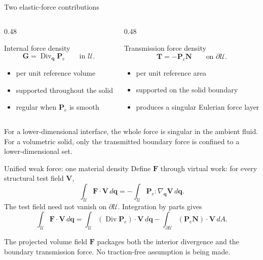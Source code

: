 \documentclass[aspectratio=169,11pt]{beamer}
\newcommand{\Xvec}{\bm{q}}
\newcommand{\Fvec}{\bm{F}}
\newcommand{\Pten}{\bm{P}_{e}}
\newcommand{\Nvec}{\bm{N}}
\begin{document}
\begin{frame}{Two elastic-force contributions}
\begin{columns}[T,onlytextwidth]
  \begin{column}{0.48\textwidth}
  \begin{block}{Internal force density}
    \[
      \bm{G}=\operatorname{Div}_{\!\Xvec}\Pten
      \qquad\text{in }\mathcal U.
    \]
    \begin{itemize}
      \item per unit reference volume
      \item supported throughout the solid
      \item regular when \(\Pten\) is smooth
    \end{itemize}
  \end{block}
  \end{column}
  \begin{column}{0.48\textwidth}
  \begin{block}{Transmission force density}
    \[
      \bm{T}=-\Pten\Nvec
      \qquad\text{on }\partial\mathcal U.
    \]
    \begin{itemize}
      \item per unit reference area
      \item supported on the solid boundary
      \item produces a singular Eulerian force layer
    \end{itemize}
  \end{block}
  \end{column}
\end{columns}

\begin{punchbox}
For a lower-dimensional interface, the whole force is singular in the ambient fluid. For a volumetric solid, only the transmitted boundary force is confined to a lower-dimensional set.
\end{punchbox}
\end{frame}

\begin{frame}{Unified weak force: one material density}
Define \(\Fvec\) through virtual work: for every structural test field \(\bm V\),
\[
  \boxed{
  \int_{\mathcal U}\Fvec\cdot\bm V\,d\Xvec
  =-\int_{\mathcal U}\Pten:\nabla_{\!\Xvec}\bm V\,d\Xvec .}
\]
The test field need not vanish on \(\partial\mathcal U\). Integration by parts gives
\[
  \int_{\mathcal U}\Fvec\cdot\bm V\,d\Xvec
  =\int_{\mathcal U}(\operatorname{Div}\Pten)\cdot\bm V\,d\Xvec
  -\int_{\partial\mathcal U}(\Pten\Nvec)\cdot\bm V\,dA .
\]

\begin{punchbox}
The projected volume field \(\Fvec\) packages both the interior divergence and the boundary transmission force. No traction-free assumption is being made.
\end{punchbox}
\end{frame}
\end{document}
